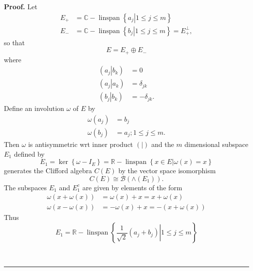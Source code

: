 \documentclass[aps,preprint]{revtex4}%
\newenvironment{proof}[1][Proof]{\noindent\textbf{#1.} }{\ \rule{0.5em}{0.5em}}
\begin{document}
\begin{proof}
Let
\begin{align}
E_{+}  &  =\mathbb{C-}\operatorname*{linspan}\left\{  \left.  a_{j}\right\vert
1\leq j\leq m\right\} \\
E_{-}  &  =\mathbb{C-}\operatorname*{linspan}\left\{  \left.  b_{j}\right\vert
1\leq j\leq m\right\}  =E_{+}^{\bot},
\end{align}
so that
\begin{equation}
E=E_{+}\oplus E_{-}%
\end{equation}
where
\begin{align}
\left(  \left.  a_{j}\right\vert b_{k}\right)   &  =0\\
\left(  \left.  a_{j}\right\vert a_{k}\right)   &  =\delta_{jk}\\
\left(  \left.  b_{j}\right\vert b_{k}\right)   &  =-\delta_{jk}.
\end{align}
Define an involution $\omega$ of $E$ by
\begin{align}
\omega\left(  a_{j}\right)   &  =b_{j}\\
\omega\left(  b_{j}\right)   &  =a_{j};1\leq j\leq m.
\end{align}
Then $\omega$ is antisymmetric wrt inner product $\left(  \left.
{}\right\vert \right)  $ and the $m$ dimensional subspace $E_{1}$ defined by
\begin{equation}
E_{1}=\ker\left\{  \omega-I_{E}\right\}  =\mathbb{R-}\operatorname*{linspan}%
\left\{  \left.  x\in E\right\vert \omega\left(  x\right)  =x\right\}
\end{equation}
generates the Clifford algebra $C\left(  E\right)  $ by the vector space
isomorphism
\begin{equation}
C\left(  E\right)  \cong\mathcal{B}\left(  \wedge\left(  E_{1}\right)
\right)  .
\end{equation}
The subspaces $E_{1}$ and $E_{1}^{c}$ are given by elements of the form
\begin{align}
\omega\left(  x+\omega\left(  x\right)  \right)   &  =\omega\left(  x\right)
+x=x+\omega\left(  x\right) \\
\omega\left(  x-\omega\left(  x\right)  \right)   &  =-\omega\left(  x\right)
+x=-\left(  x+\omega\left(  x\right)  \right)
\end{align}
Thus%
\begin{equation}
E_{1}=\mathbb{R-}\operatorname*{linspan}\left\{  \left.  \frac{1}{\sqrt{2}%
}\left(  a_{j}+b_{j}\right)  \right\vert 1\leq j\leq m\right\}
\end{equation}

\end{proof}
\end{document}
